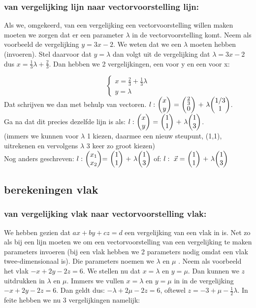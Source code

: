 
\subsubsection{van vergelijking lijn naar vectorvoorstelling lijn:}
Als we, omgekeerd, van een vergelijking een vectorvoorstelling willen maken moeten we zorgen dat er een parameter $ \lambda $ in de vectorvoorstelling komt. Neem als voorbeeld de vergelijking $ y = 3x - 2 $. We weten dat we een $ \lambda $ moeten hebben (invoeren). Stel daarvoor dat $ y =  \lambda $ dan volgt uit de vergelijking  dat $ \lambda = 3x -2 $ dus $ x = \frac{1}{3}  \lambda  + \frac{2}{3} $. Dan hebben we  2 vergelijkingen, een voor y en een voor x:

\[\begin{cases}
x = \frac{2}{3} + \frac{1}{3} \lambda\\
y =  \lambda 
\end{cases}
\] 
Dat schrijven we dan met behulp van vectoren. 
$ l: \  \vectwee {x}{y} \ = \ \vectwee {\frac{2}{3}}{0} \ +\  \lambda  \vectwee {1/3}{1}  $.\\
Ga na dat dit precies dezelfde lijn is als:
$ l: \  \vectwee {x}{y} \ = \ \vectwee {1}{1} \ +\  \lambda  \vectwee {1}{3}  $.\\ (immers we kunnen voor $ \lambda $ 1 kiezen, daarmee een nieuw steupunt, (1,1), uitrekenen en vervolgens $ \lambda $ 3 keer zo groot kiezen)\\
Nog anders geschreven:
$  l: \  \vectweesnel{x} =  \ \vectwee {1}{1} \ +\  \lambda  \vectwee {1}{3}  $ \qquad
of: $ l: \ \vec{x} = \ \vectwee{1}{1} \ + \ \lambda \vectwee {1}{3} $

\subsection{berekeningen vlak}
\subsubsection{van vergelijking vlak naar vectorvoorstelling vlak:}
We hebben gezien dat $ ax + by + cz = d $ een vergelijking van een vlak in \RD is. Net zo als bij een lijn moeten we om een vectorvoorstelling van een vergelijking te maken parameters invoeren (bij een vlak hebben we 2 parameters nodig omdat een vlak  twee-dimensionaal is). Die parameters noemen we $ \lambda $  en $ \mu $ . Neem als voorbeeld het vlak $ -x + 2y -2z = 6 $.  We stellen  nu dat $ x=  \lambda $ en $ y = \mu $. Dan kunnen we $ z$ uitdrukken in $ \lambda $  en $ \mu $. Immers we vullen  $ x=  \lambda $ en $ y = \mu $ in in de vergelijking $ -x + 2y -2z = 6 $. Dan geldt dus: $ -\lambda + 2\mu -2z = 6 $, oftewel $ z = -3 + \mu -   \frac{1}{2} \lambda $. In feite hebben we nu 3 vergelijkingen namelijk:

